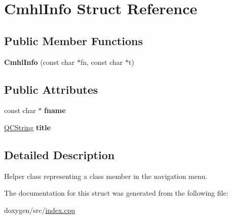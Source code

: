 \hypertarget{struct_cmhl_info}{}\section{Cmhl\+Info Struct Reference}
\label{struct_cmhl_info}
\subsection*{Public Member Functions}
\begin{DoxyCompactItemize}
\item 
\mbox{\label{struct_cmhl_info_a850470c9b71f3bb7dececa00e0c45944}} 
{\bfseries Cmhl\+Info} (const char $\ast$fn, const char $\ast$t)
\end{DoxyCompactItemize}
\subsection*{Public Attributes}
\begin{DoxyCompactItemize}
\item 
\mbox{\label{struct_cmhl_info_a5bd20fa128f0a1ee5b9c9f89f29a5b5d}} 
const char $\ast$ {\bfseries fname}
\item 
\mbox{\label{struct_cmhl_info_a1d13ea09f95c6a0cb9d97f7b78ef81c3}} 
\mbox{\hyperlink{class_q_c_string}{Q\+C\+String}} {\bfseries title}
\end{DoxyCompactItemize}


\subsection{Detailed Description}
Helper class representing a class member in the navigation menu. 

The documentation for this struct was generated from the following file\+:\begin{DoxyCompactItemize}
\item 
doxygen/src/\mbox{\hyperlink{index_8cpp}{index.\+cpp}}\end{DoxyCompactItemize}
